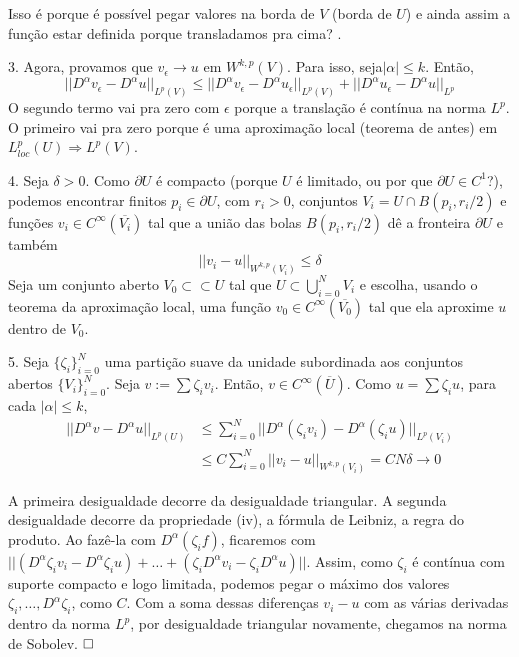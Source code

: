 \documentclass[11pt]{article}
\newcommand{\qed}{$\hfill\square$}
\newcommand{\e}{\epsilon}
\newcommand{\pu}{\partial U}
\begin{document}
 Isso é porque é possível pegar valores na borda de \( V \) (borda de \( U \)) e ainda assim a função estar definida porque transladamos pra cima? .

3. Agora, provamos que \( v_\e \rightarrow u \) em \( W^{k,p}(V) \). Para isso, seja\( |\alpha| \leq k \). Então, \[ ||D^\alpha v_\e - D^\alpha u||_{L^p(V)} \leq ||D^\alpha v_\e - D^\alpha u_\e||_{L^p(V)} + ||D^\alpha u_\e - D^\alpha u||_{L^p} \] O segundo termo vai pra zero com \( \e \) porque a translação é contínua na norma \( L^p \). O primeiro vai pra zero porque é uma aproximação local (teorema de antes) em \( L^p_{loc}(U) \Rightarrow L^p(V)  \).

4. Seja \( \delta >0 \). Como \( \pu \) é compacto (porque \( U \) é limitado, ou por que \( \pu \in C^1 \)?), podemos encontrar finitos \( p_i \in \pu \), com \( r_i>0 \), conjuntos \( V_i = U \cap B(p_i, r_i/2) \) e funções \( v_i \in C^\infty(\overline{V_i}) \) tal que a união das bolas \( B(p_i, r_i/2) \) dê a fronteira \( \pu \) e também \[ ||v_i - u||_{W^{k,p}(V_i)}\leq \delta \] Seja um conjunto aberto \( V_0 \subset\subset U \) tal que \( U \subset \bigcup_{i=0}^N V_i \) e escolha, usando o teorema da aproximação local, uma função \( v_0 \in C^\infty (\overline{V_0}) \) tal que ela aproxime \( u \) dentro de \( V_0 \).

5. Seja \( \{ \zeta_i \}_{i=0}^N \) uma partição suave da unidade subordinada aos conjuntos abertos \( \{V_i\}_{i=0}^N \). Seja \( v:= \sum \zeta_i v_i \). Então, \( v \in C^\infty (\overline{U}) \). Como \( u = \sum \zeta_i u \), para cada \( |\alpha|\leq k \), \begin{align*}
	||D^\alpha v - D^\alpha u||_{L^p(U)} &\leq \sum_{i=0}^{N} || D^\alpha (\zeta_i v_i) - D^\alpha (\zeta_i u)||_{L^p(V_i)}\\
	&\leq C \sum_{i=0}^N ||v_i - u||_{W^{k,p}(V_i)} = CN\delta \rightarrow 0
\end{align*}

A primeira desigualdade decorre da desigualdade triangular. A segunda desigualdade decorre da propriedade (iv), a fórmula de Leibniz, a regra do produto. Ao fazê-la com $D^\alpha(\zeta_i f)$, ficaremos com $||(D^\alpha\zeta_i v_i - D^\alpha\zeta_i u) + \ldots + (\zeta_i D^\alpha v_i - \zeta_i D^\alpha u) ||$. Assim, como $\zeta_i$ é contínua com suporte compacto e logo limitada, podemos pegar o máximo dos valores $\zeta_i, \ldots, D^\alpha\zeta_i$, como $C$. Com a soma dessas diferenças $v_i - u$ com as várias derivadas dentro da norma $L^p$, por desigualdade triangular novamente, chegamos na norma de Sobolev. \qed
\end{document}

